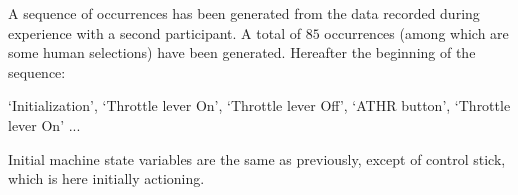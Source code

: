 A sequence of occurrences has been generated 
from the data recorded during experience 
with a second participant. 
A total of $85$ occurrences (among which are some human selections) have been generated. 
Hereafter the beginning of the sequence:

\begin{footnotesize}
`Initialization', `Throttle lever On', `Throttle lever Off', `ATHR button', `Throttle lever On' ...
\end{footnotesize}

%
%

Initial machine state variables are the same as previously, 
except of control stick, which is here initially actioning.


